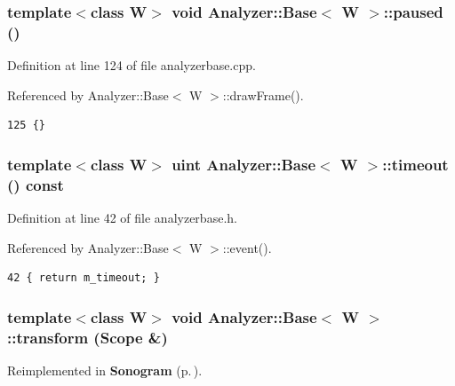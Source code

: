 \subsubsection{\setlength{\rightskip}{0pt plus 5cm}template$<$class W$>$ void {\bf Analyzer::Base}$<$ W $>$::paused ()\hspace{0.3cm}{\tt  [protected, virtual]}}\label{classAnalyzer_1_1Base_Analyzer_1_1Baseb4}




Definition at line 124 of file analyzerbase.cpp.

Referenced by Analyzer::Base$<$ W $>$::draw\-Frame().



\footnotesize\begin{verbatim}125 {}
\end{verbatim}\normalsize 
{}
\subsubsection{\setlength{\rightskip}{0pt plus 5cm}template$<$class W$>$ uint {\bf Analyzer::Base}$<$ W $>$::timeout () const\hspace{0.3cm}{\tt  [inline]}}\label{classAnalyzer_1_1Base_Analyzer_1_1Basea0}




Definition at line 42 of file analyzerbase.h.

Referenced by Analyzer::Base$<$ W $>$::event().



\footnotesize\begin{verbatim}42 { return m_timeout; }
\end{verbatim}\normalsize 
{}
\subsubsection{\setlength{\rightskip}{0pt plus 5cm}template$<$class W$>$ void {\bf Analyzer::Base}$<$ W $>$::transform ({\bf Scope} \&)\hspace{0.3cm}{\tt  [protected, virtual]}}\label{classAnalyzer_1_1Base_Analyzer_1_1Baseb2}




Reimplemented in {\bf Sonogram} {\rm (p.\,\pageref{classSonogram_Sonograma4})}.

